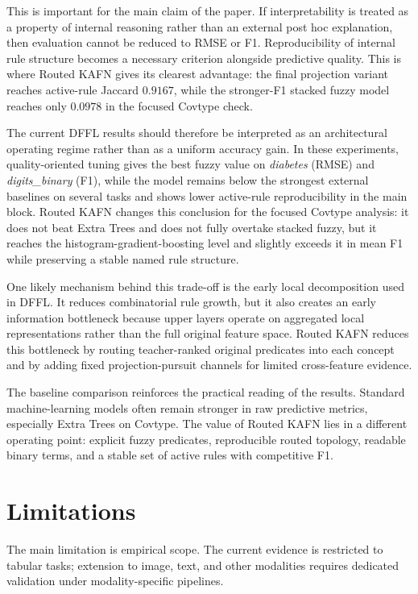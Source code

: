 \documentclass[runningheads]{llncs}
\begin{document}
This is important for the main claim of the paper. If interpretability is treated as a property of internal reasoning rather than an external post hoc explanation, then evaluation cannot be reduced to RMSE or F1. Reproducibility of internal rule structure becomes a necessary criterion alongside predictive quality. This is where Routed KAFN gives its clearest advantage: the final projection variant reaches active-rule Jaccard $0.9167$, while the stronger-F1 stacked fuzzy model reaches only $0.0978$ in the focused Covtype check.

The current DFFL results should therefore be interpreted as an architectural operating regime rather than as a uniform accuracy gain. In these experiments, quality-oriented tuning gives the best fuzzy value on \textit{diabetes} (RMSE) and \textit{digits\_binary} (F1), while the model remains below the strongest external baselines on several tasks and shows lower active-rule reproducibility in the main block. Routed KAFN changes this conclusion for the focused Covtype analysis: it does not beat Extra Trees and does not fully overtake stacked fuzzy, but it reaches the histogram-gradient-boosting level and slightly exceeds it in mean F1 while preserving a stable named rule structure.

One likely mechanism behind this trade-off is the early local decomposition used in DFFL. It reduces combinatorial rule growth, but it also creates an early information bottleneck because upper layers operate on aggregated local representations rather than the full original feature space. Routed KAFN reduces this bottleneck by routing teacher-ranked original predicates into each concept and by adding fixed projection-pursuit channels for limited cross-feature evidence.

The baseline comparison reinforces the practical reading of the results. Standard machine-learning models often remain stronger in raw predictive metrics, especially Extra Trees on Covtype. The value of Routed KAFN lies in a different operating point: explicit fuzzy predicates, reproducible routed topology, readable binary terms, and a stable set of active rules with competitive F1.

\section{Limitations}

The main limitation is empirical scope. The current evidence is restricted to tabular tasks; extension to image, text, and other modalities requires dedicated validation under modality-specific pipelines.
\end{document}
